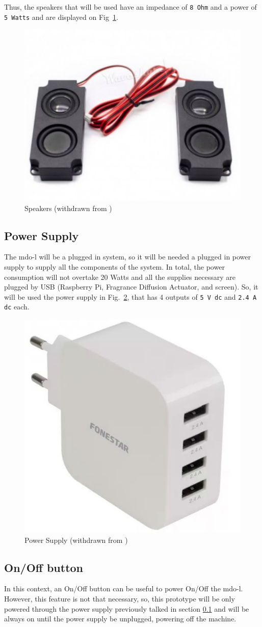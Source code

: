 Thus, the speakers that will be used have an impedance of \texttt{8 Ohm} and a power of \texttt{5 Watts} and are displayed on Fig~\ref{fig:speakers}.
%
\begin{figure}[htb!]
\centering
    \includegraphics[width=0.4\columnwidth]{./img/speakers.png}
  \caption{Speakers (withdrawn from \cite{speakers})}%
\label{fig:speakers}
\end{figure}

\subsection{Power Supply}
\label{sec:power-supply}
The \gls{mdo-l} will be a plugged in system, so it will be needed a plugged in power supply to supply all the components of the system. In total, the power consumption will not overtake 20 Watts and all the supplies necessary are plugged by USB (Raspberry Pi, Fragrance Diffusion Actuator, and screen). So, it will be used the power supply in Fig.~\ref{fig:power-supply}, that has 4 outputs of \texttt{5 V \gls{dc}} and \texttt{2.4 A \gls{dc}} each.
%
\begin{figure}[htb!]
\centering
    \includegraphics[width=0.3\columnwidth]{./img/power-supply.png}
  \caption{Power Supply (withdrawn from \cite{power-supply})}%
\label{fig:power-supply}
\end{figure}

\subsection{On/Off button}
In this context, an On/Off button can be useful to power On/Off the \gls{mdo-l}. However, this feature is not that necessary, so, this prototype will be only powered through the power supply previously talked in section \ref{sec:power-supply} and will be always on until the power supply be unplugged, powering off the machine.


